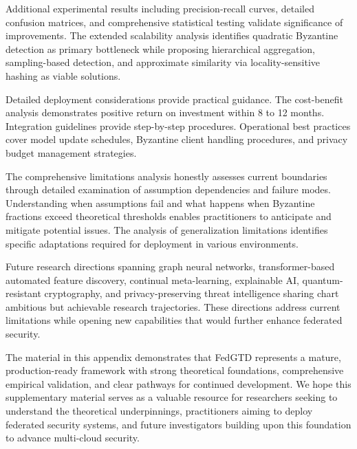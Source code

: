 \documentclass[12pt,a4paper]{article}
\theoremstyle{definition}
\begin{document}
Additional experimental results including precision-recall curves, detailed confusion matrices, and comprehensive statistical testing validate significance of improvements. The extended scalability analysis identifies quadratic Byzantine detection as primary bottleneck while proposing hierarchical aggregation, sampling-based detection, and approximate similarity via locality-sensitive hashing as viable solutions.

Detailed deployment considerations provide practical guidance. The cost-benefit analysis demonstrates positive return on investment within 8 to 12 months. Integration guidelines provide step-by-step procedures. Operational best practices cover model update schedules, Byzantine client handling procedures, and privacy budget management strategies.

The comprehensive limitations analysis honestly assesses current boundaries through detailed examination of assumption dependencies and failure modes. Understanding when assumptions fail and what happens when Byzantine fractions exceed theoretical thresholds enables practitioners to anticipate and mitigate potential issues. The analysis of generalization limitations identifies specific adaptations required for deployment in various environments.

Future research directions spanning graph neural networks, transformer-based automated feature discovery, continual meta-learning, explainable AI, quantum-resistant cryptography, and privacy-preserving threat intelligence sharing chart ambitious but achievable research trajectories. These directions address current limitations while opening new capabilities that would further enhance federated security.

The material in this appendix demonstrates that FedGTD represents a mature, production-ready framework with strong theoretical foundations, comprehensive empirical validation, and clear pathways for continued development. We hope this supplementary material serves as a valuable resource for researchers seeking to understand the theoretical underpinnings, practitioners aiming to deploy federated security systems, and future investigators building upon this foundation to advance multi-cloud security.
\end{document}
